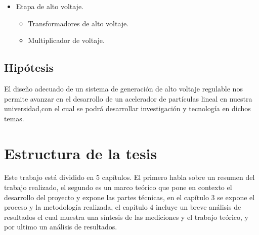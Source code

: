 \begin{itemize}
\item Etapa de alto voltaje.
\begin{itemize}
\item Transformadores de alto voltaje.
\item Multiplicador de voltaje.
\end{itemize}
\end{itemize}

\subsection{Hipótesis}
El diseño adecuado de un sistema de generación de alto voltaje regulable nos permite avanzar en el desarrollo de un acelerador de partículas lineal en nuestra universidad,con el cual se podrá desarrollar investigación y tecnología en dichos temas.

\newpage


\section{Estructura de la tesis}

Este trabajo está dividido en 5 capítulos. El primero habla sobre un resumen del trabajo realizado, el segundo es un marco teórico que pone en contexto el desarrollo del proyecto y expone las partes técnicas, en el capítulo 3 se expone el proceso y la metodología realizada, el capítulo 4 incluye un breve análisis de resultados el cual muestra una síntesis de las mediciones y el trabajo teórico, y por ultimo un análisis de resultados. 